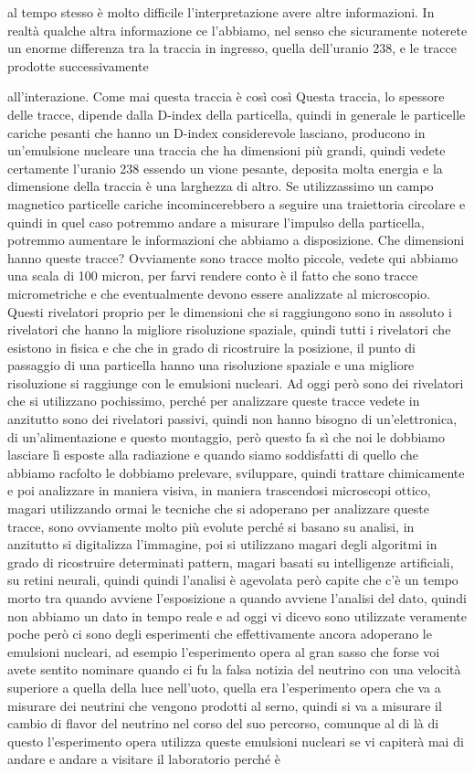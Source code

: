 al tempo stesso è molto difficile l'interpretazione avere altre informazioni. In realtà qualche altra informazione ce l'abbiamo, nel senso che sicuramente noterete un enorme differenza tra la traccia in ingresso, quella dell'uranio 238, e le tracce prodotte successivamente 

all'interazione. Come mai questa traccia è così così Questa traccia, lo spessore delle tracce, dipende dalla D-index della particella, quindi in generale le particelle cariche pesanti che hanno un D-index considerevole lasciano, producono in un'emulsione nucleare una traccia che ha dimensioni più grandi, quindi vedete certamente l'uranio 238 essendo un vione pesante, deposita molta energia e la dimensione della traccia è una larghezza di altro. Se utilizzassimo un campo magnetico particelle cariche incomincerebbero a seguire una traiettoria circolare e quindi in quel caso potremmo andare a misurare l'impulso della particella, potremmo aumentare le informazioni che abbiamo a disposizione. Che dimensioni hanno queste tracce? Ovviamente sono tracce molto piccole, vedete qui abbiamo una scala di 100 micron, per farvi rendere conto è il fatto che sono tracce micrometriche e che eventualmente devono essere analizzate al microscopio. Questi rivelatori proprio per le dimensioni che si raggiungono sono in assoluto i rivelatori che hanno la migliore risoluzione spaziale, quindi tutti i rivelatori che esistono in fisica e che che in grado di ricostruire la posizione, il punto di passaggio di una particella hanno una risoluzione spaziale e una migliore risoluzione si raggiunge con le emulsioni nucleari. Ad oggi però sono dei rivelatori che si utilizzano pochissimo, perché per analizzare queste tracce vedete in anzitutto sono dei rivelatori passivi, quindi non hanno bisogno di un'elettronica, di un'alimentazione e questo montaggio, però questo fa sì che noi le dobbiamo lasciare lì esposte alla radiazione e quando siamo soddisfatti di quello che abbiamo racfolto le dobbiamo prelevare, sviluppare, quindi trattare chimicamente e poi analizzare in maniera visiva, in maniera trascendosi microscopi ottico, magari utilizzando ormai le tecniche che si adoperano per analizzare queste tracce, sono ovviamente molto più evolute perché si basano su analisi, in anzitutto si digitalizza l'immagine, poi si utilizzano magari degli algoritmi in grado di ricostruire determinati pattern, magari basati su intelligenze artificiali, su retini neurali, quindi quindi l'analisi è agevolata però capite che c'è un tempo morto tra quando avviene l'esposizione a quando avviene l'analisi del dato, quindi non abbiamo un dato in tempo reale e ad oggi vi dicevo sono utilizzate veramente poche però ci sono degli esperimenti che effettivamente ancora adoperano le emulsioni nucleari, ad esempio l'esperimento opera al gran sasso che forse voi avete sentito nominare quando ci fu la falsa notizia del neutrino con una velocità superiore a quella della luce nell'uoto, quella era l'esperimento opera che va a misurare dei neutrini che vengono prodotti al serno, quindi si va a misurare il cambio di flavor del neutrino nel corso del suo percorso, comunque al di là di questo l'esperimento opera utilizza queste emulsioni nucleari se vi capiterà mai di andare e andare a visitare il laboratorio perché è 